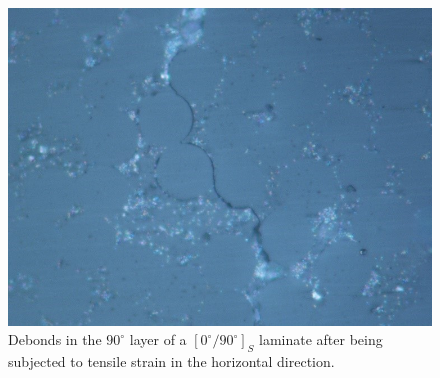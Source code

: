 \begin{figure}[!htb]
\centering
  \includegraphics[width=\textwidth]{paperD/debonds.jpg}
\caption{Debonds in the $90^{\circ}$ layer of a $\left[0^{\circ}/90^{\circ}\right]_{S}$ laminate after being subjected to tensile strain in the horizontal direction.}\label{paperD:fig:debonds-microscope}
\end{figure}

